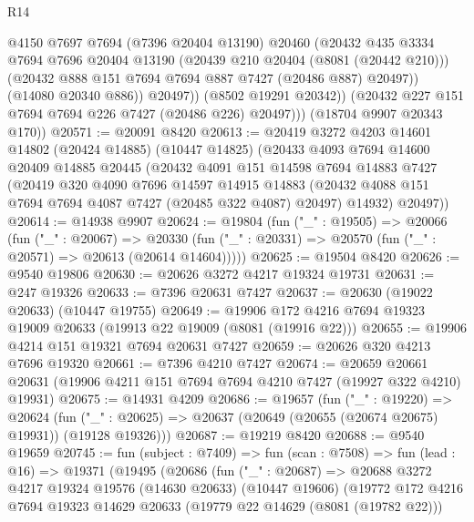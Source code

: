 \begin{lexlean}{R14}
\begin{coremodule}
                  @4150
                  @7697
                  @7694
                  (@7396 @20404 @13190)
                  @20460
                  (@20432
                    @435
                    @3334
                    @7694
                    @7696
                    @20404
                    @13190
                    (@20439 @210 @20404 (@8081 (@20442 @210)))
                    (@20432 @888 @151 @7694 @7694 @887 @7427 (@20486 @887) @20497))
                  (@14080 @20340 @886))
                @20497))
            (@8502 @19291 @20342))
          (@20432 @227 @151 @7694 @7694 @226 @7427 (@20486 @226) @20497)))
      (@18704 @9907 @20343 @170))
@20571 := @20091 @8420
@20613 := @20419
    @3272
    @4203
    @14601
    @14802
    (@20424 @14885)
    (@10447 @14825)
    (@20433
      @4093
      @7694
      @14600
      @20409
      @14885
      @20445
      (@20432
        @4091
        @151
        @14598
        @7694
        @14883
        @7427
        (@20419
          @320
          @4090
          @7696
          @14597
          @14915
          @14883
          (@20432 @4088 @151 @7694 @7694 @4087 @7427 (@20485 @322 @4087) @20497)
          @14932)
        @20497))
@20614 := @14938 @9907
@20624 := @19804
    (fun ("_" : @19505) =>
    @20066
      (fun ("_" : @20067) =>
      @20330 (fun ("_" : @20331) => @20570 (fun ("_" : @20571) => @20613 (@20614 @14604)))))
@20625 := @19504 @8420
@20626 := @9540 @19806
@20630 := @20626 @3272 @4217 @19324 @19731
@20631 := @247 @19326
@20633 := @7396 @20631 @7427
@20637 := @20630 (@19022 @20633) (@10447 @19755)
@20649 := @19906 @172 @4216 @7694 @19323 @19009 @20633 (@19913 @22 @19009 (@8081 (@19916 @22)))
@20655 := @19906 @4214 @151 @19321 @7694 @20631 @7427
@20659 := @20626 @320 @4213 @7696 @19320
@20661 := @7396 @4210 @7427
@20674 := @20659
    @20661
    @20631
    (@19906 @4211 @151 @7694 @7694 @4210 @7427 (@19927 @322 @4210) @19931)
@20675 := @14931 @4209
@20686 := @19657
    (fun ("_" : @19220) =>
    @20624 (fun ("_" : @20625) => @20637 (@20649 (@20655 (@20674 @20675) @19931)) (@19128 @19326)))
@20687 := @19219 @8420
@20688 := @9540 @19659
@20745 := fun (subject : @7409) =>
  fun (scan : @7508) =>
  fun (lead : @16) =>
  @19371
    (@19495
      (@20686
        (fun ("_" : @20687) =>
        @20688
          @3272
          @4217
          @19324
          @19576
          (@14630 @20633)
          (@10447 @19606)
          (@19772
            @172
            @4216
            @7694
            @19323
            @14629
            @20633
            (@19779 @22 @14629 (@8081 (@19782 @22)))

\end{coremodule}
\end{lexlean}
